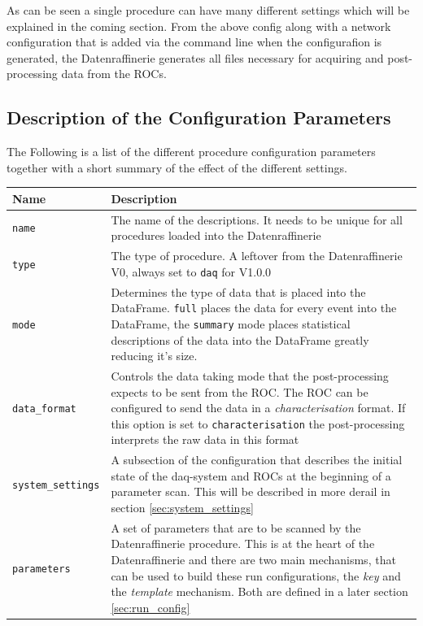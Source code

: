 \documentclass[11pt]{article}
\begin{document}
As can be seen a single procedure can have many different settings which will be explained in the coming section. From the above config along with a network configuration that is added via the command line when the configurafion is generated, the Datenraffinerie generates all files necessary for acquiring and post-processing data from the ROCs.

\subsection{Description of the Configuration Parameters}
The Following is a list of the different procedure configuration parameters together with a short summary of the effect of the different settings.

\begin{center}
\begin{tabular}{| m{4cm} | m{8.5cm} |}
Name & Description \\
\hline	\hline
\verb|name| & The name of the descriptions. It needs to be unique for all procedures loaded into the Datenraffinerie \\ \hline
\verb|type| & The type of procedure. A leftover from the Datenraffinerie V0, always set to \verb|daq| for V1.0.0 \\ \hline
\verb|mode| & Determines the type of data that is placed into the DataFrame. \verb|full| places the data for every event into the DataFrame, the \verb|summary| mode places statistical descriptions of the data into the DataFrame greatly reducing it's size. \\ \hline
\verb|data_format| & Controls the data taking mode that the post-processing expects to be sent from the ROC. The ROC can be configured to send the data in a \emph{characterisation} format. If this option is set to \verb|characterisation| the post-processing interprets the raw data in this format \\ \hline
\verb|system_settings| & A subsection of the configuration that describes the initial state of the daq-system and ROCs at the beginning of a parameter scan. This will be described in more derail in section \ref{sec:system_settings}\\ \hline
\verb|parameters| & A set of parameters that are to be scanned by the Datenraffinerie procedure. This is at the heart of the Datenraffinerie and there are two main mechanisms, that can be used to build these run configurations, the \emph{key} and the \emph{template} mechanism. Both are defined in a later section \ref{sec:run_config} \\ \hline

\end{tabular}
\end{center}
\end{document}
